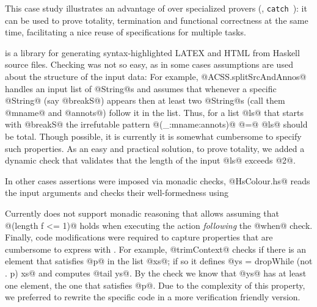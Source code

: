 This case study illustrates an advantage of \toolname over specialized provers 
(\eg, \texttt{catch}~\citep{catch}): it can be used to prove totality, termination and
functional correctness at the same time, facilitating a nice reuse of
specifications for multiple tasks.

\mypara{\lbhscolour} is a library for generating syntax-highlighted LATEX and HTML from
Haskell source files.
Checking \lbhscolour was not so easy, as in some cases assumptions are used about the 
structure of the input data:
%
For example, @ACSS.splitSrcAndAnnos@ handles an
input list of @String@s and assumes that whenever
a specific @String@ (say @breakS@) appears then 
at least two @String@s (call them @mname@ and @annots@)
follow it in the list.
Thus, for a list @ls@ that starts with @breakS@ 
the irrefutable pattern  @(_:mname:annots)@ @=@ @ls@
should be total.
%
Though possible, it is currently it is somewhat cumbersome to specify such 
properties. 
%
As an easy and practical solution, 
to prove totality, we added a dynamic check that 
validates that the length of the input @ls@ exceeds @2@.


In other cases assertions were imposed via monadic checks, \eg @HsColour.hs@ reads the input arguments and 
checks their well-formedness using 
%
%
Currently \toolname does not support monadic reasoning that 
allows assuming that @(length f <= 1)@
holds when executing the action \emph{following} the @when@ check. 
%
Finally, code modifications were required to capture properties 
that are cumbersome to express with \toolname.
%
For example, @trimContext@ checks if there is an element that 
satisfies @p@ in the list @xs@; if so it defines 
%
@ys = dropWhile (not . p) xs@
%
and computes @tail ys@.
%
By the check we know that @ys@ has at least one element, the 
one that satisfies @p@. 
%
Due to the complexity of this property, we preferred to rewrite the specific code 
in a more verification friendly version. 


